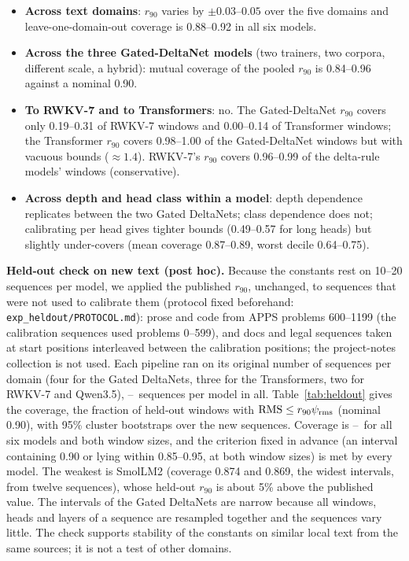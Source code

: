 \begin{itemize}
  \item \textbf{Across text domains}: $r_{90}$ varies by $\pm0.03$--$0.05$ over the five domains and leave-one-domain-out coverage is 0.88--0.92 in all six models.
  \item \textbf{Across the three Gated-DeltaNet models} (two trainers, two corpora, different scale, a hybrid): mutual coverage of the pooled $r_{90}$ is 0.84--0.96 against a nominal 0.90.
  \item \textbf{To RWKV-7 and to Transformers}: no. The Gated-DeltaNet $r_{90}$ covers only 0.19--0.31 of RWKV-7 windows and 0.00--0.14 of Transformer windows; the Transformer $r_{90}$ covers 0.98--1.00 of the Gated-DeltaNet windows but with vacuous bounds ($\approx1.4$). RWKV-7's $r_{90}$ covers 0.96--0.99 of the delta-rule models' windows (conservative).
  \item \textbf{Across depth and head class within a model}: depth dependence replicates between the two Gated DeltaNets; class dependence does not; calibrating per head gives tighter bounds (0.49--0.57 for long heads) but slightly under-covers (mean coverage 0.87--0.89, worst decile 0.64--0.75).
\end{itemize}
\textbf{Held-out check on new text (post hoc).} Because the constants rest on 10--20 sequences per model, we applied the published $r_{90}$, unchanged, to sequences that were not used to calibrate them (protocol fixed beforehand: \texttt{exp\_heldout/PROTOCOL.md}): prose and code from APPS problems 600--1199 (the calibration sequences used problems 0--599), and docs and legal sequences taken at start positions interleaved between the calibration positions; the project-notes collection is not used. Each pipeline ran on its original number of sequences per domain (four for the Gated DeltaNets, three for the Transformers, two for RWKV-7 and Qwen3.5), \heldSeqLo--\heldSeqHi\ sequences per model in all. Table~\ref{tab:heldout} gives the coverage, the fraction of held-out windows with $\mathrm{RMS}\le r_{90}\psi_{\rm rms}$ (nominal 0.90), with 95\% cluster bootstraps over the new sequences. Coverage is \heldCovLo--\heldCovHi\ for all six models and both window sizes, and the criterion fixed in advance (an interval containing 0.90 or lying within 0.85--0.95, at both window sizes) is met by every model. The weakest is SmolLM2 (coverage 0.874 and 0.869, the widest intervals, from twelve sequences), whose held-out $r_{90}$ is about 5\% above the published value. The intervals of the Gated DeltaNets are narrow because all windows, heads and layers of a sequence are resampled together and the sequences vary little. The check supports stability of the constants on similar local text from the same sources; it is not a test of other domains.

